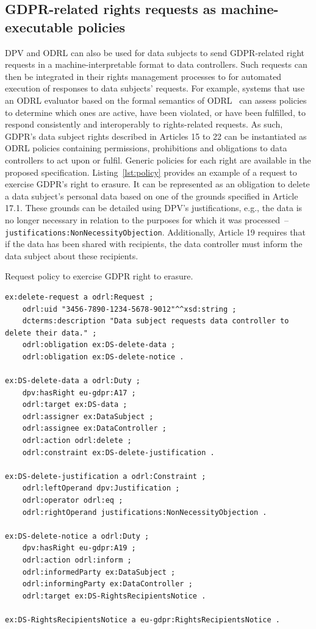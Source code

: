 \documentclass{IOS-Book-Article}     %
\begin{document}
\subsection{GDPR-related rights requests as machine-executable policies}
\label{sec:policies}

DPV and ODRL can also be used for data subjects to send GDPR-related right requests in a machine-interpretable format to data controllers.
Such requests can then be integrated in their rights management processes to for automated execution of responses to data subjects' requests.
For example, systems that use an ODRL evaluator based on the formal semantics of ODRL~\cite{fornara_odrl_2024} can assess policies to determine which ones are active, have been violated, or have been fulfilled, to respond consistently and interoperably to rights-related requests.
As such, GDPR's data subject rights described in Articles 15 to 22 can be instantiated as ODRL policies containing permissions, prohibitions and obligations to data controllers to act upon or fulfil.
Generic policies for each right are available in the proposed specification.
Listing~\ref{lst:policy} provides an example of a request to exercise GDPR's right to erasure.
It can be represented as an obligation to delete a data subject's personal data based on one of the grounds specified in Article 17.1.
These grounds can be detailed using DPV's justifications, e.g., the data is no longer necessary in relation to the purposes for which it was processed~--\texttt{justifications:NonNecessityObjection}.
Additionally, Article 19 requires that if the data has been shared with recipients, the data controller must inform the data subject about these recipients.

\begin{listing}[ht]
\caption{Request policy to exercise GDPR right to erasure.}
\label{lst:policy}
\begin{verbatim}
ex:delete-request a odrl:Request ;
    odrl:uid "3456-7890-1234-5678-9012"^^xsd:string ;
    dcterms:description "Data subject requests data controller to delete their data." ;
    odrl:obligation ex:DS-delete-data ;
    odrl:obligation ex:DS-delete-notice .

ex:DS-delete-data a odrl:Duty ;
    dpv:hasRight eu-gdpr:A17 ;
    odrl:target ex:DS-data ;
    odrl:assigner ex:DataSubject ;
    odrl:assignee ex:DataController ;
    odrl:action odrl:delete ;
    odrl:constraint ex:DS-delete-justification .

ex:DS-delete-justification a odrl:Constraint ;
    odrl:leftOperand dpv:Justification ;
    odrl:operator odrl:eq ;
    odrl:rightOperand justifications:NonNecessityObjection .

ex:DS-delete-notice a odrl:Duty ;
    dpv:hasRight eu-gdpr:A19 ;
    odrl:action odrl:inform ;
    odrl:informedParty ex:DataSubject ;
    odrl:informingParty ex:DataController ;
    odrl:target ex:DS-RightsRecipientsNotice .

ex:DS-RightsRecipientsNotice a eu-gdpr:RightsRecipientsNotice .
\end{verbatim}
\end{listing}
\end{document}
